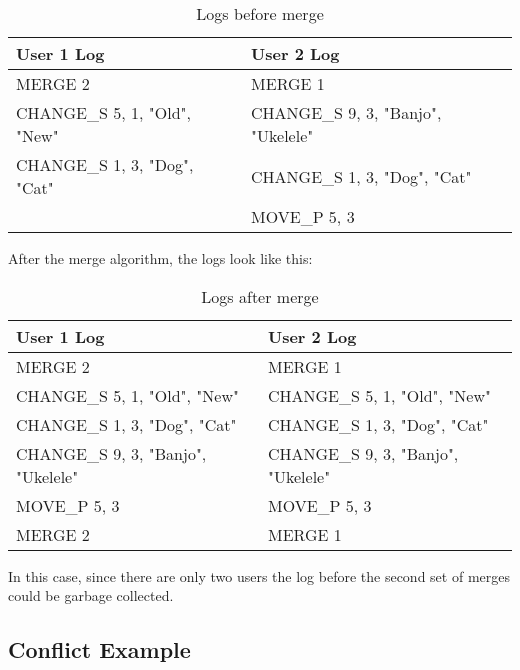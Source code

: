 \begin{table}[h!]
\begin{center}
 \begin{tabular} {|p{7cm}|p{7cm}|}
  \hline
   User 1 Log & User 2 Log \\
  \hline \hline
   MERGE 2 & MERGE 1 \\
   CHANGE\_S 5, 1, "Old", "New" & CHANGE\_S 9, 3, "Banjo", "Ukelele" \\
   CHANGE\_S 1, 3, "Dog", "Cat" & CHANGE\_S 1, 3, "Dog", "Cat" \\
           & MOVE\_P 5, 3 \\
  \hline 
 \end{tabular}
\end{center}
\caption{Logs before merge}
\label{table:ex1_before}
\end{table}

After the merge algorithm, the logs look like this:

\begin{table}[h!]
\begin{center}
 \begin{tabular} {|p{7cm}|p{7cm}|}
  \hline
   User 1 Log & User 2 Log \\
  \hline \hline
   MERGE 2 & MERGE 1 \\
   CHANGE\_S 5, 1, "Old", "New" & CHANGE\_S 5, 1, "Old", "New" \\
   CHANGE\_S 1, 3, "Dog", "Cat" & CHANGE\_S 1, 3, "Dog", "Cat" \\
   CHANGE\_S 9, 3, "Banjo", "Ukelele" &  CHANGE\_S 9, 3, "Banjo", "Ukelele"  \\
   MOVE\_P 5, 3  & MOVE\_P 5, 3 \\
   MERGE 2 & MERGE 1 \\
  \hline 
 \end{tabular}
\end{center}
\caption{Logs after merge}
\label{table:ex1_after}
\end{table}

In this case, since there are only two users the log before the second set of merges
could be garbage collected.

\subsection{Conflict Example}

